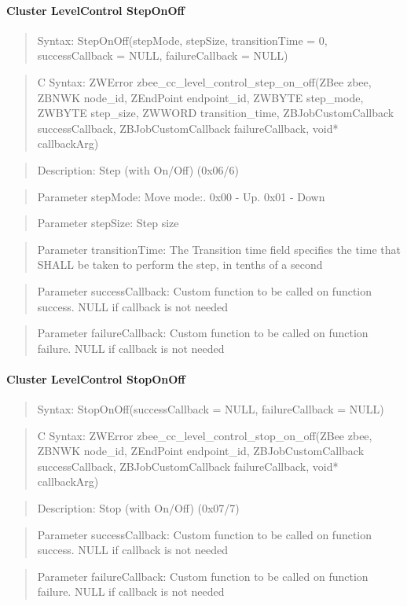 \paragraph{Cluster LevelControl StepOnOff}
\begin{quote}Syntax: StepOnOff(stepMode, stepSize, transitionTime = 0, successCallback = NULL, failureCallback = NULL)\end{quote}
\begin{quote}C Syntax: ZWError zbee\_cc\_level\_control\_step\_on\_off(ZBee zbee, ZBNWK node\_id, ZEndPoint endpoint\_id, ZWBYTE step\_mode, ZWBYTE step\_size, ZWWORD transition\_time, ZBJobCustomCallback successCallback, ZBJobCustomCallback failureCallback, void* callbackArg)\end{quote}
\begin{quote}Description: Step (with On/Off) (0x06/6)\end{quote}
\begin{quote}Parameter stepMode: Move mode:. 0x00 - Up. 0x01 - Down\end{quote}
\begin{quote}Parameter stepSize: Step size\end{quote}
\begin{quote}Parameter transitionTime: The Transition time field specifies the time that SHALL be taken to perform the step, in tenths of a second\end{quote}
\begin{quote}Parameter successCallback: Custom function to be called on function success. NULL if callback is not needed\end{quote}
\begin{quote}Parameter failureCallback: Custom function to be called on function failure. NULL if callback is not needed\end{quote}


\paragraph{Cluster LevelControl StopOnOff}
\begin{quote}Syntax: StopOnOff(successCallback = NULL, failureCallback = NULL)\end{quote}
\begin{quote}C Syntax: ZWError zbee\_cc\_level\_control\_stop\_on\_off(ZBee zbee, ZBNWK node\_id, ZEndPoint endpoint\_id, ZBJobCustomCallback successCallback, ZBJobCustomCallback failureCallback, void* callbackArg)\end{quote}
\begin{quote}Description: Stop (with On/Off) (0x07/7)\end{quote}
\begin{quote}Parameter successCallback: Custom function to be called on function success. NULL if callback is not needed\end{quote}
\begin{quote}Parameter failureCallback: Custom function to be called on function failure. NULL if callback is not needed\end{quote}


